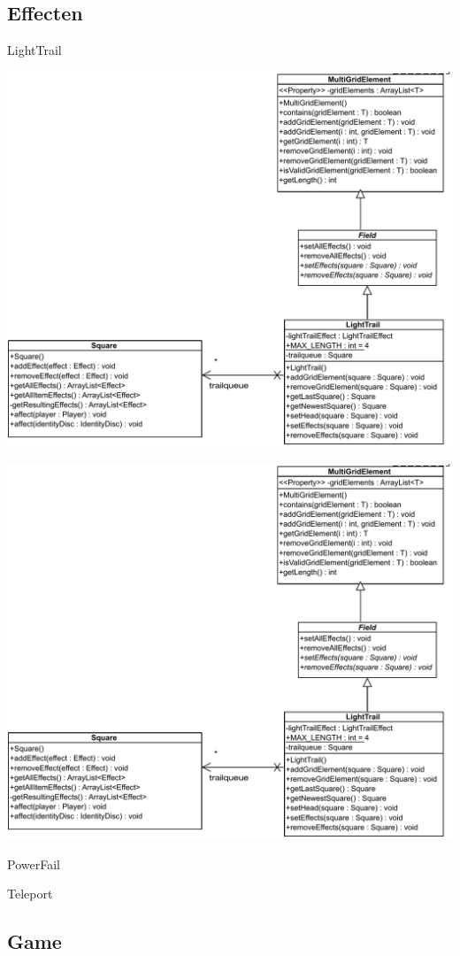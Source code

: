 \documentclass[11pt,t]{beamer}
\begin{document}
\subsection{Effecten}

\begin{frame}{LightTrail}
\begin{center}
\includegraphics[width=0.6\linewidth]{images/lighttrail}
\end{center}
\end{frame}

\begin{frame}
\begin{center}
\includegraphics[width=0.6\linewidth]{images/lighttrail}
\end{center}
\end{frame}

\begin{frame}{PowerFail}
\end{frame}

\begin{frame}{Teleport}
\end{frame}

\subsection{Game}
\end{document}
